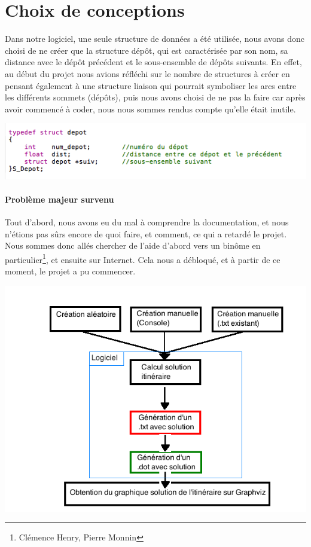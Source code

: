\documentclass[12pt,a4paper]{report}
\begin{document}
\section{Choix de conceptions}
Dans notre logiciel, une seule structure de données a été utilisée, nous avons donc choisi de ne créer que la structure dépôt, qui est caractérisée par son nom, sa distance avec le dépôt précédent et le sous-ensemble de dépôts suivants. En effet, au début du projet nous avions réfléchi sur le nombre de structures à créer en pensant également à une structure liaison qui pourrait symboliser les arcs entre les différents sommets (dépôts), puis nous avons choisi de ne pas la faire car après avoir commencé à coder, nous nous sommes rendus compte qu'elle était inutile. 

\begin{center}
\includegraphics[scale=0.7]{capture2.png}
\label{fig1}
\end{center} 

\paragraph{Problème majeur survenu}
Tout d'abord, nous avons eu du mal \`{a} comprendre la documentation, et nous n'\'{e}tions pas s\^urs encore de quoi faire, et comment, ce qui a retard\'{e} le projet. Nous sommes donc all\'{e}s chercher de l'aide d'abord vers un binôme en particulier\footnote{Clémence Henry, Pierre Monnin}, et ensuite sur Internet. Cela nous a d\'{e}bloqu\'{e}, et \`{a} partir de ce moment, le projet a pu commencer.

\begin{center}
\includegraphics[scale=0.5]{conception.png}
\label{fig2}
\end{center} 
\end{document}
